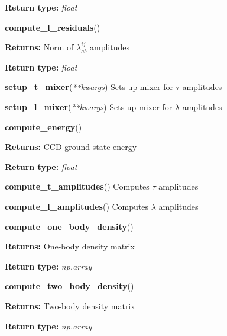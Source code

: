 \begin{tcolorbox}
{\begin{adjustwidth}{4em}{}
        \textbf{Return type:} \emph{float}
        \end{adjustwidth}

    \hspace{2em} \textbf{compute\_l\_residuals}()
        \begin{adjustwidth}{4em}{}
        \textbf{Returns:} Norm of $\lambda^{ij}_{ab}$ amplitudes
        
        \textbf{Return type:} \emph{float}
        \end{adjustwidth}

    \hspace{2em} \textbf{setup\_t\_mixer}(\emph{**kwargs})
        Sets up mixer for $\tau$ amplitudes

    \hspace{2em} \textbf{setup\_l\_mixer}(\emph{**kwargs})
        Sets up mixer for $\lambda$ amplitudes

    \hspace{2em} \textbf{compute\_energy}()
        \begin{adjustwidth}{4em}{}
        \textbf{Returns:} CCD ground state energy

        \textbf{Return type:} {\emph{float}}
        \end{adjustwidth}

    \hspace{2em} \textbf{compute\_t\_amplitudes}()
        Computes $\tau$ amplitudes

    \hspace{2em} \textbf{compute\_l\_amplitudes}()
        Computes $\lambda$ amplitudes
    
    \hspace{2em} \textbf{compute\_one\_body\_density}()
        \begin{adjustwidth}{4em}{}
        \textbf{Returns:} One-body density matrix

        \textbf{Return type:} \emph{np.array}
        \end{adjustwidth}

    \hspace{2em} \textbf{compute\_two\_body\_density}()
        \begin{adjustwidth}{4em}{}
        \textbf{Returns:} Two-body density matrix

        \textbf{Return type:} \emph{np.array}
        \end{adjustwidth}

    }
\end{tcolorbox}